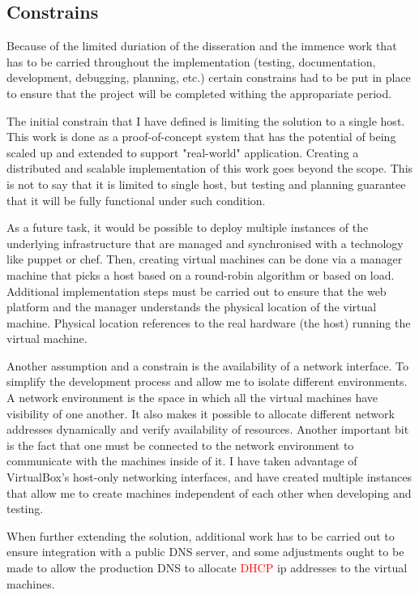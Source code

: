\documentclass{article}
\begin{document}
  \subsection{Constrains}
  Because of the limited duriation of the disseration and the immence work that has to be carried throughout the implementation (testing, documentation, development, debugging, planning, etc.) certain constrains had to be put in place to ensure that the project will be completed withing the appropariate period.
  
  The initial constrain that I have defined is limiting the solution to a single host. This work is done as a proof-of-concept system that has the potential of being scaled up and extended to support "real-world" application. 
  Creating a distributed and scalable implementation of this work goes beyond the scope. This is not to say that it is limited to single host, but testing and planning guarantee that it will be fully functional under such condition.
  
  As a future task, it would be possible to deploy multiple instances of the underlying infrastructure that are managed and synchronised with a technology like puppet or chef. Then, creating virtual machines can be done via a manager machine that picks a host based on a round-robin algorithm or based on load. Additional implementation steps must be carried out to ensure that the web platform and the manager understands the physical location of the virtual machine. Physical location references to the real hardware (the host) running the virtual machine.
  
  Another assumption and a constrain is the availability of a network interface. To simplify the development process and allow me to isolate different environments. A network environment is the space in which all the virtual machines have visibility of one another. It also makes it possible to allocate different network addresses dynamically and verify availability of resources. Another important bit is the fact that one must be connected to the network environment to communicate with the machines inside of it. I have taken advantage of VirtualBox's host-only networking interfaces, and have created multiple instances that allow me to create machines independent of each other when developing and testing.
  
  When further extending the solution, additional work has to be carried out to ensure integration with a public DNS server, and some adjustments ought to be made to allow the production DNS to allocate \textcolor{red}{DHCP} ip addresses to the virtual machines.
  
\end{document}
